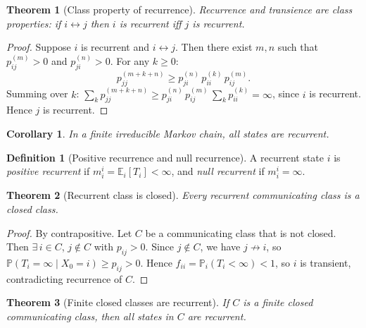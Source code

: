 \documentclass[12pt, a4paper]{article}
\theoremstyle{definition}
\newtheorem{definition}{Definition}[section]
\theoremstyle{plain}
\newtheorem{theorem}{Theorem}[section]
\newtheorem{corollary}{Corollary}[section]
\newcommand{\PP}{\mathbb{P}}
\newcommand{\EE}{\mathbb{E}}
\begin{document}
\begin{theorem}[Class property of recurrence]
Recurrence and transience are class properties: if $i \leftrightarrow j$ then $i$ is recurrent iff $j$ is recurrent.
\end{theorem}

\begin{proof}
Suppose $i$ is recurrent and $i \leftrightarrow j$. Then there exist $m, n$ such that $p_{ij}^{(m)} > 0$ and $p_{ji}^{(n)} > 0$. For any $k \ge 0$:
\begin{equation*}
  p_{jj}^{(m+k+n)} \ge p_{ji}^{(n)}\, p_{ii}^{(k)}\, p_{ij}^{(m)}.
\end{equation*}
Summing over $k$: $\sum_k p_{jj}^{(m+k+n)} \ge p_{ji}^{(n)}\, p_{ij}^{(m)}\, \sum_k p_{ii}^{(k)} = \infty$, since $i$ is recurrent. Hence $j$ is recurrent.
\end{proof}

\begin{corollary}
In a finite irreducible Markov chain, all states are recurrent.
\end{corollary}

\begin{definition}[Positive recurrence and null recurrence]
A recurrent state $i$ is \emph{positive recurrent} if $m_i^i = \EE_i[T_i] < \infty$, and \emph{null recurrent} if $m_i^i = \infty$.
\end{definition}


\begin{theorem}[Recurrent class is closed]
Every recurrent communicating class is a closed class.
\end{theorem}

\begin{proof}
By contrapositive. Let $C$ be a communicating class that is not closed. Then $\exists\, i \in C$, $j \notin C$ with $p_{ij} > 0$. Since $j \notin C$, we have $j \not\to i$, so $\PP(T_i = \infty \mid X_0 = i) \ge p_{ij} > 0$. Hence $f_{ii} = \PP_i(T_i < \infty) < 1$, so $i$ is transient, contradicting recurrence of $C$.
\end{proof}

\begin{theorem}[Finite closed classes are recurrent]
If $C$ is a finite closed communicating class, then all states in $C$ are recurrent.
\end{theorem}
\end{document}
